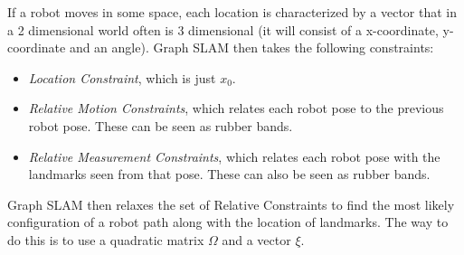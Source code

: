 If a robot moves in some space, each location is characterized by a vector that in a 2 dimensional world often is 3 dimensional (it will consist of a x-coordinate, y-coordinate and an angle). 
Graph SLAM then takes the following constraints: 
\begin{itemize}
\item \textit{Location Constraint}, which is just $x_0$.
\item \textit{Relative Motion Constraints}, which relates each robot pose to the previous robot pose. These can be seen as rubber bands.
\item \textit{Relative Measurement Constraints}, which relates each robot pose with the landmarks seen from that pose. These can also be seen as rubber bands.
\end{itemize}
Graph SLAM then relaxes the set of Relative Constraints to find the most likely configuration of a robot path along with the location of landmarks.
The way to do this is to use a quadratic matrix $\Omega$ and a vector $\xi$. 

